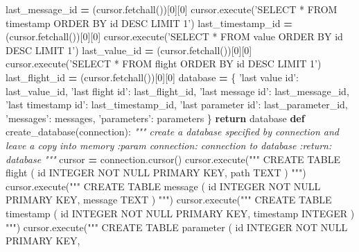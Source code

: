 \documentclass[12pt,oneside]{reedthesis}
\newenvironment{Shaded}{\begin{snugshade}}{\end{snugshade}}
\newcommand{\KeywordTok}[1]{\textcolor[rgb]{0.13,0.29,0.53}{\textbf{#1}}}
\newcommand{\DecValTok}[1]{\textcolor[rgb]{0.00,0.00,0.81}{#1}}
\newcommand{\StringTok}[1]{\textcolor[rgb]{0.31,0.60,0.02}{#1}}
\newcommand{\CommentTok}[1]{\textcolor[rgb]{0.56,0.35,0.01}{\textit{#1}}}
\newcommand{\ControlFlowTok}[1]{\textcolor[rgb]{0.13,0.29,0.53}{\textbf{#1}}}
\newcommand{\OperatorTok}[1]{\textcolor[rgb]{0.81,0.36,0.00}{\textbf{#1}}}
\newcommand{\NormalTok}[1]{#1}
\theoremstyle{definition}
\theoremstyle{definition}
\theoremstyle{definition}
\theoremstyle{remark}
\begin{document}
\begin{Shaded}
\begin{Highlighting}[]
{{{{{\NormalTok{    last_message_id }\OperatorTok{=}\NormalTok{ (cursor.fetchall())[}\DecValTok{0}\NormalTok{][}\DecValTok{0}\NormalTok{]}
\NormalTok{    cursor.execute(}\StringTok{'SELECT * FROM timestamp ORDER BY id DESC LIMIT 1'}\NormalTok{)}
\NormalTok{    last_timestamp_id }\OperatorTok{=}\NormalTok{ (cursor.fetchall())[}\DecValTok{0}\NormalTok{][}\DecValTok{0}\NormalTok{]}
\NormalTok{    cursor.execute(}\StringTok{'SELECT * FROM value ORDER BY id DESC LIMIT 1'}\NormalTok{)}
\NormalTok{    last_value_id }\OperatorTok{=}\NormalTok{ (cursor.fetchall())[}\DecValTok{0}\NormalTok{][}\DecValTok{0}\NormalTok{]}
\NormalTok{    cursor.execute(}\StringTok{'SELECT * FROM flight ORDER BY id DESC LIMIT 1'}\NormalTok{)}
\NormalTok{    last_flight_id }\OperatorTok{=}\NormalTok{ (cursor.fetchall())[}\DecValTok{0}\NormalTok{][}\DecValTok{0}\NormalTok{]}
\NormalTok{    database }\OperatorTok{=}\NormalTok{ \{}
        \StringTok{'last value id'}\NormalTok{: last_value_id,}
        \StringTok{'last flight id'}\NormalTok{: last_flight_id,}
        \StringTok{'last message id'}\NormalTok{: last_message_id,}
        \StringTok{'last timestamp id'}\NormalTok{: last_timestamp_id,}
        \StringTok{'last parameter id'}\NormalTok{: last_parameter_id,}
        \StringTok{'messages'}\NormalTok{: messages,}
        \StringTok{'parameters'}\NormalTok{: parameters}
\NormalTok{    \}}
    \ControlFlowTok{return}\NormalTok{ database}
\KeywordTok{def}\NormalTok{ create_database(connection):    }
    \CommentTok{""" create a database specified by connection and leave a copy }
\CommentTok{    into memory}
\CommentTok{    :param connection: connection to database}
\CommentTok{    :return: database}
\CommentTok{    """}
\NormalTok{    cursor }\OperatorTok{=}\NormalTok{ connection.cursor()}
\NormalTok{    cursor.execute(}\StringTok{"""}
\StringTok{      CREATE TABLE flight (}
\StringTok{        id INTEGER NOT NULL PRIMARY KEY, }
\StringTok{        path TEXT}
\StringTok{        )}
\StringTok{      """}\NormalTok{)}
\NormalTok{    cursor.execute(}\StringTok{"""}
\StringTok{      CREATE TABLE message (}
\StringTok{        id INTEGER NOT NULL PRIMARY KEY, }
\StringTok{        message TEXT}
\StringTok{        )}
\StringTok{      """}\NormalTok{)}
\NormalTok{    cursor.execute(}\StringTok{"""}
\StringTok{      CREATE TABLE timestamp (}
\StringTok{        id INTEGER NOT NULL PRIMARY KEY, }
\StringTok{        timestamp INTEGER}
\StringTok{        )}
\StringTok{      """}\NormalTok{)}
\NormalTok{    cursor.execute(}\StringTok{"""}
\StringTok{      CREATE TABLE parameter (}
\StringTok{        id INTEGER NOT NULL PRIMARY KEY, }
}}}}}
\end{Highlighting}
\end{Shaded}
\end{document}
